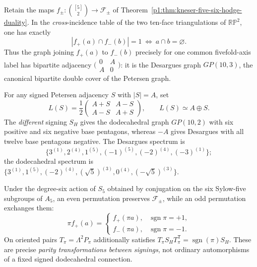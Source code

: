 \documentclass[11pt]{article}
\begin{document}
\begin{theorem}
\label{p1:thm:v341-desargues-rp2-parity}
Retain the maps $f_\pm:\binom{[5]}2\to\mathcal F_\pm$ of
Theorem~\ref{p1:thm:kneser-five-six-hodge-duality}.  In the
\emph{cross}-incidence table of the two ten-face triangulations of
$\mathbb{RP}^2$, one has exactly
\[
 \boxed{|f_+(a)\cap f_-(b)|=1\ \Longleftrightarrow\ a\cap b=\varnothing.}
\]
Thus the graph joining $f_+(a)$ to $f_-(b)$ precisely for
one common fivefold-axis label has bipartite adjacency
$\bigl(\begin{smallmatrix}0&A\\A&0\end{smallmatrix}\bigr)$:
it is the Desargues graph $GP(10,3)$, the canonical bipartite
double cover of the Petersen graph.

For any signed Petersen adjacency $S$ with $|S|=A$, set
\[
 L(S)=\frac12\begin{pmatrix}A+S&A-S\\A-S&A+S\end{pmatrix},
 \qquad L(S)\simeq A\oplus S.
\]
The \emph{different} signing $S_H$ gives the dodecahedral graph
$GP(10,2)$ with six positive and six negative base pentagons,
whereas $-A$ gives Desargues with all twelve base pentagons negative.
The Desargues spectrum is
\[
 \{3^{(1)},2^{(4)},1^{(5)},(-1)^{(5)},(-2)^{(4)},(-3)^{(1)}\};
\]
the dodecahedral spectrum is
$\{3^{(1)},1^{(5)},(-2)^{(4)},(\sqrt5)^{(3)},0^{(4)},(-\sqrt5)^{(3)}\}$.

Under the degree-six action of $S_5$ obtained by conjugation on the
six Sylow-five subgroups of $A_5$, an even permutation preserves
$\mathcal F_\pm$, while an odd permutation exchanges them:
\[
 \pi f_+(a)=\begin{cases}f_+(\pi a),&\operatorname{sgn}\pi=+1,\\
                             f_-(\pi a),&\operatorname{sgn}\pi=-1.
             \end{cases}
\]
On oriented pairs $T_\pi=\Lambda^2P_\pi$ additionally satisfies
$T_\pi S_HT_\pi^{\mathsf T}=\operatorname{sgn}(\pi)S_H$.
These are precise \emph{parity transformations between signings},
not ordinary automorphisms of a fixed signed dodecahedral connection.
\end{theorem}
\end{document}
